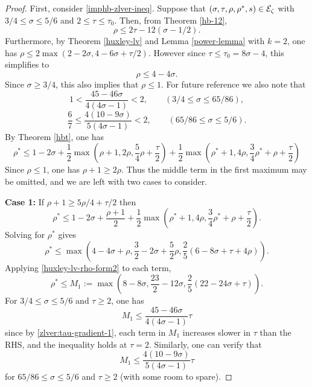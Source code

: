 \begin{proof}
First, consider \eqref{imphb-zlver-ineq}. Suppose that $(\sigma, \tau, \rho, \rho^*, s)\in \mathcal{E}_\zeta$ with $3/4 \le \sigma \le 5/6$ and $2 \le \tau \le \tau_0$. Then, from Theorem \ref{hb-12},
\begin{equation}\label{hb-lv-rho-form}
\rho \le 2\tau - 12(\sigma - 1/2).
\end{equation}
Furthermore, by Theorem \ref{huxley-lv} and Lemma \ref{power-lemma} with $k = 2$, one has $\rho \le 2\max(2 - 2\sigma, 4 - 6\sigma + \tau/2)$. However since $\tau \le \tau_0 = 8\sigma - 4$, this simplifies to
\begin{equation}
\label{huxley-lv-rho-form2}
\rho \le 4 - 4\sigma.
\end{equation}
Since $\sigma \ge 3/4$, this also implies that $\rho \le 1$. For future reference we also note that
\begin{equation}\label{zlver:tau-gradient-1}
1 < \frac{45 - 46\sigma}{4(4\sigma - 1)} < 2,\qquad (3/4 \le \sigma \le 65/86),
\end{equation}
\begin{equation}\label{zlver:tau-gradient-2}
\frac{6}{7} \le \frac{4(10 - 9\sigma)}{5(4\sigma - 1)} < 2,\qquad (65/86 \le \sigma \le 5/6).
\end{equation}
By Theorem \ref{hbt}, one has
\[
\rho^* \leq 1-2\sigma + \frac{1}{2}\max(\rho+1, 2\rho, \frac{5}{4}\rho+\frac{\tau}{2}) + \frac{1}{2}\max(\rho^*+1, 4\rho, \frac{3}{4}\rho^*+\rho+\frac{\tau}{2})
\]
Since $\rho \le 1$, one has $\rho + 1 \ge 2\rho$. Thus the middle term in the first maximum may be omitted, and we are left with two cases to consider.

\textbf{Case 1:} If $\rho + 1 \ge 5\rho/4 + \tau/2$ then
\[
\rho^* \le 1 -2\sigma + \frac{\rho + 1}{2} + \frac{1}{2}\max(\rho^* + 1, 4\rho, \frac{3}{4}\rho^*+\rho +\frac{\tau}{2}).
\]
Solving for $\rho^*$ gives
\[
\rho^* \le \max(4 - 4\sigma + \rho, \frac{3}{2} - 2\sigma + \frac{5}{2}\rho, \frac{2}{5}(6 - 8\sigma + \tau + 4\rho)).
\]
Applying \eqref{huxley-lv-rho-form2} to each term,
\[
\rho^* \le M_1 := \max(8 - 8\sigma, \frac{23}{2} - 12\sigma, \frac{2}{5}(22 - 24\sigma + \tau)).
\]
For $3/4 \le \sigma \le 5/6$ and $\tau \ge 2$, one has
\[
M_1 \le \frac{45 - 46\sigma}{4(4\sigma - 1)}\tau
\]
since by \eqref{zlver:tau-gradient-1}, each term in $M_1$ increases slower in $\tau$ than the RHS, and the inequality holds at $\tau = 2$. Similarly, one can verify that
\[
M_1 \le \frac{4(10 - 9\sigma)}{5(4\sigma - 1)}\tau
\]
for $65/86 \le \sigma \le 5/6$ and $\tau \ge 2$ (with some room to spare).


\end{proof}
